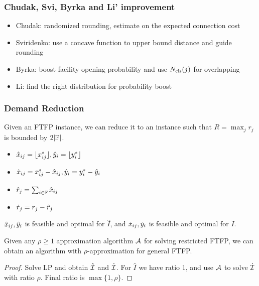 \documentclass[hyperref, xcolor=dvipsnames]{beamer}
\begin{document}
\begin{frame}
  \frametitle{Chudak, Svi, Byrka and Li' improvement}
  \begin{itemize}
  \item Chudak: randomized rounding, estimate on the expected connection cost
  \item Sviridenko: use a concave function to upper bound distance and guide rounding
  \item Byrka: boost facility opening probability and use $N_{{\mbox{\scriptsize\rm cls}}}(j)$ for overlapping
  \item Li: find the right distribution for probability boost
  \end{itemize}
\end{frame}

\begin{frame}
  \frametitle{Demand Reduction} Given an FTFP instance, we can reduce
  it to an instance such that $R=\max_{j}r_j$ is bounded by
  $2|\mathbb{F}|$.

  \begin{itemize}
    \item ${\hat x}_{ij} = { \lfloor x_{ij}^\ast \rfloor }, {\hat y}_{i} = { \lfloor y_i^\ast \rfloor }$
    \item ${\dot x}_{ij} = x_{ij}^\ast - {\hat x}_{ij}, {\dot y}_{i} = y_i^\ast
      - {\hat y}_{i}$
    \item ${\hat r}_j = \sum_{i\in\mathbb{F}} {\hat x}_{ij}$
    \item ${\dot r}_j = r_j - {\hat r}_j$
  \end{itemize}
  
  \begin{claim}
    ${\hat x}_{ij}, {\hat y}_{i}$ is feasible and optimal for $\hat I$, and
    ${\dot x}_{ij}, {\dot y}_{i}$ is feasible and optimal for $\dot I$.
  \end{claim}
\end{frame}

\begin{frame}
  \begin{theorem}
    Given any $\rho\geq 1$ approximation algorithm ${\cal A}$ for solving
    restricted FTFP, we can obtain an algorithm with
    $\rho$-approximation for general FTFP.
  \end{theorem}
  \begin{proof}
    Solve LP and obtain $\hat {\mathcal{I}}$ and $\dot {\mathcal{I}}$. For $\hat I$ we have
    ratio $1$, and use ${\cal A}$ to solve $\dot {\mathcal{I}}$ with ratio
    $\rho$. Final ratio is $\max\{1,\rho\}$.
  \end{proof}
\end{frame}
\end{document}

